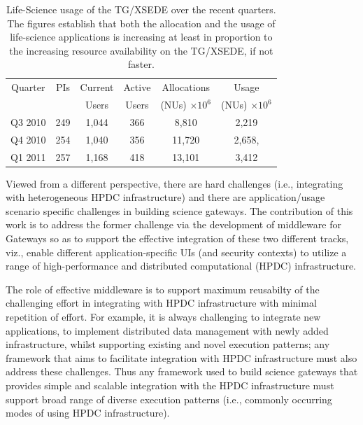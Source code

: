 \documentclass[]{svjour3}
\begin{document}
\begin{table}
\centering
 \small
\begin{tabular}{|c|c|c|c|c|c|} 
  \hline  Quarter & PIs & Current & Active & Allocations  & Usage\\
  & & Users  &  Users & (NUs) $\times 10^6$& (NUs) $\times 10^6$ \\ \hline
  Q3 2010 & 249 & 1,044 & 366 & 8,810   & 2,219  \\ \hline
  Q4 2010 & 254 & 1,040 & 356 & 11,720  & 2,658, \\ \hline
  Q1 2011 & 257 & 1,168 & 418 & 13,101  & 3,412\\ \hline 
\end{tabular} 
\caption{Life-Science usage of the TG/XSEDE over the recent
  quarters. The figures establish that both the  allocation and the
  usage of life-science applications is increasing at least in
  proportion to the increasing resource availability on the TG/XSEDE,
  if not faster.}
 \label{tg2011} 
\end{table}





Viewed from a different perspective, there are hard challenges (i.e.,
integrating with heterogeneous HPDC infrastructure) and there are
application/usage scenario specific challenges in building science gateways. The
contribution of this work is to address the former challenge via the
development of middleware for Gateways so as to support the effective
integration of these two different tracks, viz., enable different
application-specific UIs (and security contexts) to utilize a range of
high-performance and distributed computational (HPDC) infrastructure.

The role of effective middleware is to support maximum reusabilty of
the challenging effort in integrating with HPDC infrastructure with
minimal repetition of effort.  For example, it is always challenging
to integrate new applications, to implement distributed data
management with newly added infrastructure, whilst supporting existing
and novel execution patterns; any framework that aims to facilitate
integration with HPDC infrastructure must also address these
challenges.  Thus any framework used to build science gateways that provides simple
and scalable integration with the HPDC infrastructure must support
broad range of diverse execution patterns (i.e., commonly occurring
modes of using HPDC infrastructure).
\end{document}
